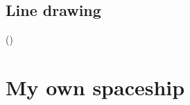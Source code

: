 \documentclass[
	letterpaper, %
	10pt, %
]{CSUniSchoolLabReport}
\begin{document}
\subsection{Line drawing}
(\cite{Madan:2014})
\section{My own spaceship}

\subsection*{}

\printbibliography%

\end{document}

